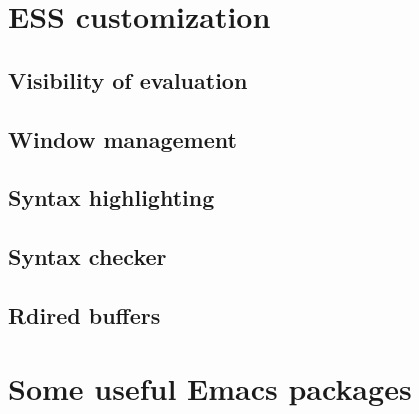 \documentclass[presentation]{beamer}
\begin{document}
\section{ESS customization}
\label{sec:org22c865d}
\subsection{Visibility of evaluation}
\label{sec:org1dcedff}
\subsection{Window management}
\label{sec:orge090efc}
\subsection{Syntax highlighting}
\label{sec:org9b2581e}
\subsection{Syntax checker}
\label{sec:orgf006e2b}
\subsection{Rdired buffers}
\label{sec:orgb2a8b10}

\section{Some useful Emacs packages}
\label{sec:orgdf57b84}
\end{document}
